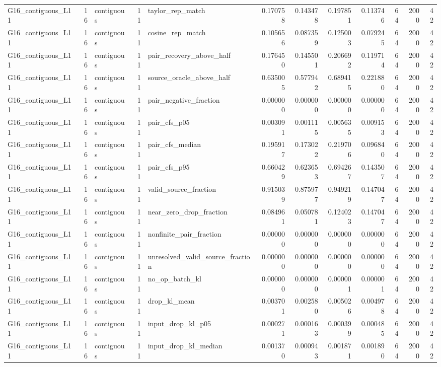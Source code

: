 \begin{tabular}{lrlrlrrrrrrr}
G16_contiguous_L11 & 16 & contiguous & 11 & taylor_rep_match & 0.170758 & 0.143478 & 0.197851 & 0.113746 & 64 & 2000 & 42 \\
G16_contiguous_L11 & 16 & contiguous & 11 & cosine_rep_match & 0.105656 & 0.087359 & 0.125003 & 0.079245 & 64 & 2000 & 42 \\
G16_contiguous_L11 & 16 & contiguous & 11 & pair_recovery_above_half & 0.176450 & 0.145501 & 0.206692 & 0.119714 & 64 & 2000 & 42 \\
G16_contiguous_L11 & 16 & contiguous & 11 & source_oracle_above_half & 0.635005 & 0.577942 & 0.689415 & 0.221880 & 64 & 2000 & 42 \\
G16_contiguous_L11 & 16 & contiguous & 11 & pair_negative_fraction & 0.000000 & 0.000000 & 0.000000 & 0.000000 & 64 & 2000 & 42 \\
G16_contiguous_L11 & 16 & contiguous & 11 & pair_cfs_p05 & 0.003091 & 0.001115 & 0.005635 & 0.009153 & 64 & 2000 & 42 \\
G16_contiguous_L11 & 16 & contiguous & 11 & pair_cfs_median & 0.195917 & 0.173022 & 0.219706 & 0.096840 & 64 & 2000 & 42 \\
G16_contiguous_L11 & 16 & contiguous & 11 & pair_cfs_p95 & 0.660429 & 0.623653 & 0.694267 & 0.143507 & 64 & 2000 & 42 \\
G16_contiguous_L11 & 16 & contiguous & 11 & valid_source_fraction & 0.915039 & 0.875977 & 0.949219 & 0.147047 & 64 & 2000 & 42 \\
G16_contiguous_L11 & 16 & contiguous & 11 & near_zero_drop_fraction & 0.084961 & 0.050781 & 0.124023 & 0.147047 & 64 & 2000 & 42 \\
G16_contiguous_L11 & 16 & contiguous & 11 & nonfinite_pair_fraction & 0.000000 & 0.000000 & 0.000000 & 0.000000 & 64 & 2000 & 42 \\
G16_contiguous_L11 & 16 & contiguous & 11 & unresolved_valid_source_fraction & 0.000000 & 0.000000 & 0.000000 & 0.000000 & 64 & 2000 & 42 \\
G16_contiguous_L11 & 16 & contiguous & 11 & no_op_batch_kl & 0.000000 & 0.000000 & 0.000001 & 0.000001 & 64 & 2000 & 42 \\
G16_contiguous_L11 & 16 & contiguous & 11 & drop_kl_mean & 0.003701 & 0.002580 & 0.005026 & 0.004978 & 64 & 2000 & 42 \\
G16_contiguous_L11 & 16 & contiguous & 11 & input_drop_kl_p05 & 0.000271 & 0.000163 & 0.000399 & 0.000485 & 64 & 2000 & 42 \\
G16_contiguous_L11 & 16 & contiguous & 11 & input_drop_kl_median & 0.001370 & 0.000943 & 0.001871 & 0.001890 & 64 & 2000 & 42 \\

\end{tabular}
